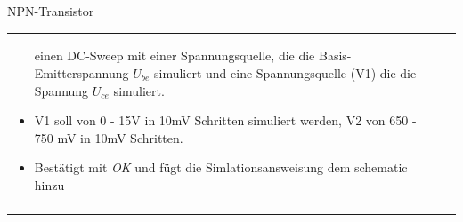 \begin{frame}[t]{NPN-Transistor}
\begin{spacing}{0.9}
\begin{tiny}
\begin{table}[h!]
\begin{tabular}{p{3cm} p{7cm}}
\begin{minipage}{.7\textwidth}
\begin{itemize}
                    einen DC-Sweep mit einer Spannungsquelle, die die Basis-Emitterspannung $U_{be}$ simuliert und eine Spannungsquelle (V1) die die Spannung
                    $U_{ce}$ simuliert.
              \item V1 soll von 0 - 15V in 10mV Schritten simuliert werden, V2 von 650 - 750 mV in 10mV Schritten.
              \item Bestätigt mit \textit{OK} und fügt die Simlationsansweisung dem schematic hinzu
            \end{itemize}
          \end{minipage}
          \\
                                                & \\
          \hline
        \end{tabular}

      \end{table}

    \end{tiny} \end{spacing}

\end{frame}



